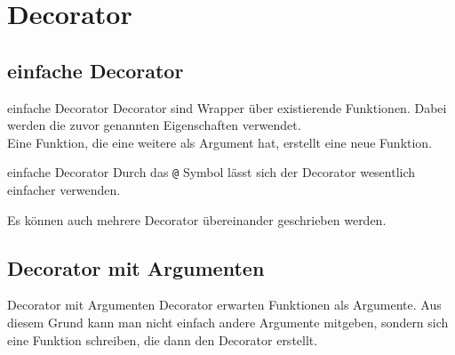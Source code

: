 \section{Decorator}
\subsection{einfache Decorator}
\begin{frame}{einfache Decorator}
	Decorator sind Wrapper über existierende Funktionen. Dabei werden die zuvor genannten Eigenschaften verwendet.\\
	Eine Funktion, die eine weitere als Argument hat, erstellt eine neue Funktion.
	
\end{frame}

\begin{frame}[fragile]{einfache Decorator}
	Durch das \texttt{@} Symbol lässt sich der Decorator wesentlich einfacher verwenden.
	
	Es können auch mehrere Decorator übereinander geschrieben werden.
\end{frame}

\subsection{Decorator mit Argumenten}
\begin{frame}{Decorator mit Argumenten}
	Decorator erwarten Funktionen als Argumente. Aus diesem Grund kann man nicht einfach andere Argumente mitgeben, sondern sich eine Funktion schreiben, die dann den Decorator erstellt.
	
\end{frame}



